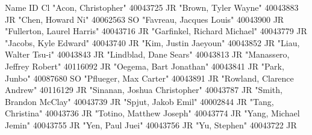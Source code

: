 Name	ID	Cl
"Acon, Christopher"	40043725	JR
"Brown, Tyler Wayne"	40043883	JR
"Chen, Howard Ni"	40062563	SO
"Favreau, Jacques Louis"	40043900	JR
"Fullerton, Laurel Harris"	40043716	JR
"Garfinkel, Richard Michael"	40043779	JR
"Jacobs, Kyle Edward"	40043740	JR
"Kim, Justin Jaeyoun"	40043852	JR
"Liau, Walter Tsu-i"	40043843	JR
"Lindblad, Dane Sears"	40043813	JR
"Manassero, Jeffrey Robert"	40116092	JR
"Oegema, Bart Jonathan"	40043841	JR
"Park, Junbo"	40087680	SO
"Pflueger, Max Carter"	40043891	JR
"Rowland, Clarence Andrew"	40116129	JR
"Sinanan, Joshua Christopher"	40043787	JR
"Smith, Brandon McClay"	40043739	JR
"Spjut, Jakob Emil"	40002844	JR
"Tang, Christina"	40043736	JR
"Totino, Matthew Joseph"	40043774	JR
"Yang, Michael Jemin"	40043755	JR
"Yen, Paul Juei"	40043756	JR
"Yu, Stephen"	40043722	JR